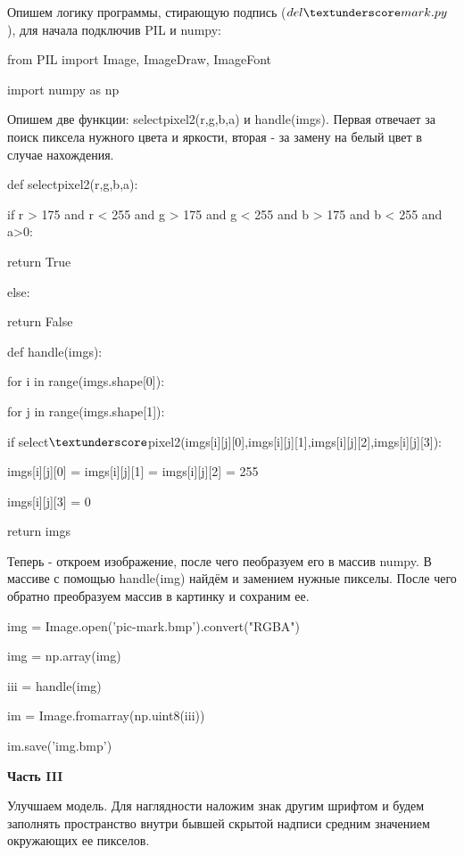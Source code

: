 \documentclass{article}
\newcommand\tab[1][1cm]{\hspace*{#1}}
\begin{document}
Опишем логику программы, стирающую подпись ($del\textunderscore mark.py$), для начала подключив PIL и numpy:

\textsf{from PIL import Image, ImageDraw, ImageFont} 

\textsf{import numpy as np}

Опишем две функции: select\textunderscore pixel2(r,g,b,a) и handle(imgs). Первая отвечает за поиск пиксела нужного цвета и яркости, вторая - за замену на белый цвет в случае нахождения.

{
       
def select\textunderscore pixel2(r,g,b,a):

\tab[1cm] if r > 175 and r < 255 and g > 175 and g < 255 and b > 175 and b < 255 and a>0:

\tab[2cm]        return True
 
\tab[1cm]    else:

\tab[2cm]        return False
        
def handle(imgs):

\tab[1cm]    for  i in range(imgs.shape[0]):
    
\tab[2cm]        for j in range(imgs.shape[1]):
            
\tab[3cm]            if select$\textunderscore $pixel2(imgs[i][j][0],imgs[i][j][1],imgs[i][j][2],imgs[i][j][3]):
               
\tab[4cm]                imgs[i][j][0] =  imgs[i][j][1] = imgs[i][j][2] = 255
                
\tab[4cm]                imgs[i][j][3] = 0
           
\tab[1cm]    return imgs

 }


 Теперь - откроем изображение, после чего пеобразуем его в массив numpy. В массиве с помощью handle(img) найдём и замением нужные пикселы. После чего обратно преобразуем массив в картинку и сохраним ее.
 
{

img = Image.open('pic-mark.bmp').convert("RGBA")
 
img = np.array(img)
 
iii = handle(img)
 
im = Image.fromarray(np.uint8(iii))

im.save('img.bmp')
} 
 
\newpage
\begin{center}
{\large\bf Часть III}
\end{center}
Улучшаем модель. Для наглядности наложим знак другим шрифтом и будем заполнять пространство внутри бывшей скрытой надписи средним значением окружающих ее пикселов.
  
\end{document}
